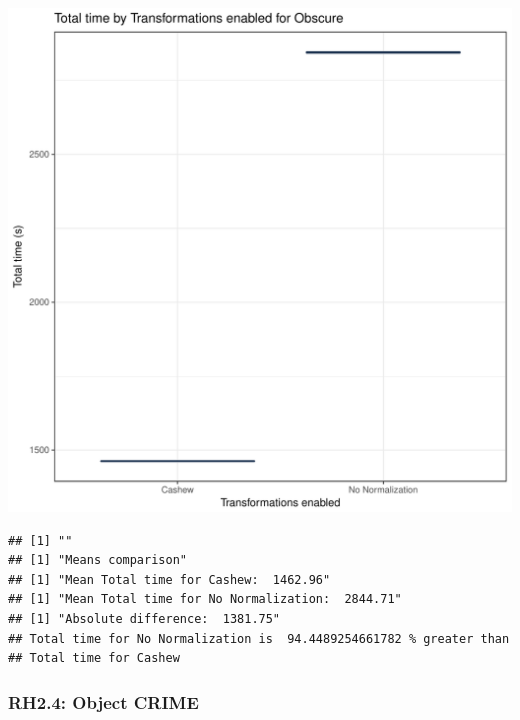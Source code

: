 \documentclass{article}\usepackage[]{graphicx}\usepackage[]{color}
\makeatletter
\def\maxwidth{ %
  \ifdim\Gin@nat@width>\linewidth
    \linewidth
  \else
    \Gin@nat@width
  \fi
}
\newenvironment{kframe}{%
 \def\at@end@of@kframe{}%
 \ifinner\ifhmode%
  \def\at@end@of@kframe{\end{minipage}}%
  \begin{minipage}{\columnwidth}%
 \fi\fi%
 \def\FrameCommand##1{\hskip\@totalleftmargin \hskip-\fboxsep
 \colorbox{shadecolor}{##1}\hskip-\fboxsep
     \hskip-\linewidth \hskip-\@totalleftmargin \hskip\columnwidth}%
 \MakeFramed {\advance\hsize-\width
   \@totalleftmargin\z@ \linewidth\hsize
   \@setminipage}}%
 {\par\unskip\endMakeFramed%
 \at@end@of@kframe}
\newenvironment{knitrout}{}{} %
\makeatother
\begin{document}
\begin{knitrout}
\color{fgcolor}
\includegraphics[width=\maxwidth]{figure/RH2_obscure-1} 
\begin{kframe}

{\ttfamily\noindent\bfseries\color{errorcolor}{\#\# Error in eval(expr, envir, enclos): object 'shap\_cashew\_obscure' not found}}\begin{verbatim}
## [1] ""
## [1] "Means comparison"
## [1] "Mean Total time for Cashew:  1462.96"
## [1] "Mean Total time for No Normalization:  2844.71"
## [1] "Absolute difference:  1381.75"
## Total time for No Normalization is  94.4489254661782 % greater than 
## Total time for Cashew
\end{verbatim}
\end{kframe}
\end{knitrout}


\subsubsection{RH2.4: Object CRIME}
\end{document}
